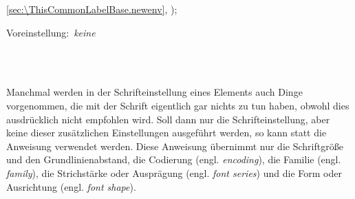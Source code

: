 {{{\begin{table}
\begin{desctabular}
{                \autoref{sec:\ThisCommonLabelBase.newenv},
                );
                \par
                \mbox{Voreinstellung: \emph{keine}}%
              }\\[-1.7ex]
              \\[-1.7ex]
            \end{desctabular}
          \end{table}
        }{%
        }%
      }%
    }%
  \fi%
\fi
\EndIndexGroup
{}%


\begin{Declaration}
\end{Declaration}
Manchmal werden in der Schrifteinstellung
eines Elements auch Dinge vorgenommen, die mit der Schrift eigentlich gar
nichts zu tun haben, obwohl dies ausdrücklich nicht empfohlen wird. Soll dann
nur die Schrifteinstellung, aber keine dieser zusätzlichen Einstellungen
ausgeführt werden, so kann statt
 die Anweisung
 verwendet werden. Diese Anweisung übernimmt nur die
Schriftgröße und den Grundlinienabstand, die Codierung
(engl. \emph{encoding}), die Familie (engl. \emph{family}), die Strichstärke
oder Ausprägung (engl. \emph{font series}) und die Form oder Ausrichtung
(engl. \emph{font shape}).

